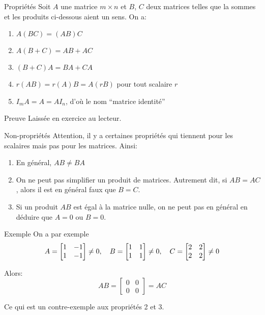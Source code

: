 \documentclass[a4paper]{article}
\begin{document}
\begin{parag}{Propriétés}
    Soit $A$ une matrice $m \times n$ et $B$, $C$ deux matrices telles que la sommes et les produits ci-dessous aient un sens. On a:
   \begin{enumerate}
       \item $A\left(BC\right) = \left(AB\right)C$
       \item $A\left(B + C\right) = AB + AC$
       \item $\left(B + C\right)A = BA + CA$
       \item $r\left(AB\right) = r\left(A\right)B = A\left(rB\right)$ pour tout scalaire $r$
       \item $I_m A = A = A I_n$, d'où le nom ``matrice identité''
   \end{enumerate}

    \begin{subparag}{Preuve}
       Laissée en exercice au lecteur.
    \end{subparag}
\end{parag}

\begin{parag}{Non-propriétés}
    Attention, il y a certaines propriétés qui tiennent pour les scalaires mais pas pour les matrices. Ainsi:
    \begin{enumerate}
        \item En général, $AB \neq BA$
        \item On ne peut pas simplifier un produit de matrices. Autrement dit, si $AB = AC$, alors il est en général faux que $B = C$.
        \item Si un produit $AB$ est égal à la matrice nulle, on ne peut pas en général en déduire que $A = 0$ ou $B = 0$.
    \end{enumerate}

    \begin{subparag}{Exemple}
        On a par exemple
        \[A = \begin{bmatrix} 1 & -1 \\ 1 & -1 \end{bmatrix} \neq 0, \quad B = \begin{bmatrix} 1 & 1 \\ 1 & 1 \end{bmatrix} \neq 0, \quad C = \begin{bmatrix} 2 & 2 \\ 2 & 2 \end{bmatrix}\neq 0\]

        Alors:
        \[AB = \begin{bmatrix} 0 & 0 \\ 0 & 0 \end{bmatrix} = AC\]

        Ce qui est un contre-exemple aux propriétés 2 et 3.
    \end{subparag}

\end{parag}
\end{document}
